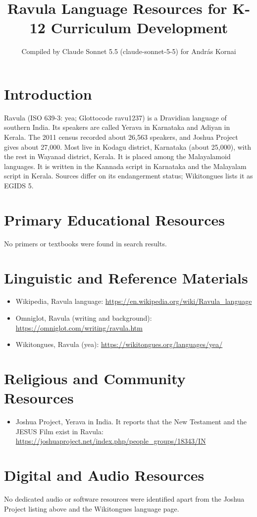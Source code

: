 \documentclass[12pt]{article}
\title{Ravula Language Resources for K-12 Curriculum Development}
\author{Compiled by Claude Sonnet 5.5 (claude-sonnet-5-5) for Andr\'as Kornai}
\date{}
\begin{document}
\maketitle

\section{Introduction}
Ravula (ISO 639-3: yea; Glottocode ravu1237) is a Dravidian language of southern India. Its speakers are called Yerava in Karnataka and Adiyan in Kerala. The 2011 census recorded about 26,563 speakers, and Joshua Project gives about 27,000. Most live in Kodagu district, Karnataka (about 25,000), with the rest in Wayanad district, Kerala. It is placed among the Malayalamoid languages. It is written in the Kannada script in Karnataka and the Malayalam script in Kerala. Sources differ on its endangerment status; Wikitongues lists it as EGIDS 5.

\section{Primary Educational Resources}
No primers or textbooks were found in search results.

\section{Linguistic and Reference Materials}
\begin{itemize}
\item Wikipedia, Ravula language: \url{https://en.wikipedia.org/wiki/Ravula_language}
\item Omniglot, Ravula (writing and background): \url{https://omniglot.com/writing/ravula.htm}
\item Wikitongues, Ravula (yea): \url{https://wikitongues.org/languages/yea/}
\end{itemize}

\section{Religious and Community Resources}
\begin{itemize}
\item Joshua Project, Yerava in India. It reports that the New Testament and the JESUS Film exist in Ravula: \url{https://joshuaproject.net/index.php/people_groups/18343/IN}
\end{itemize}

\section{Digital and Audio Resources}
No dedicated audio or software resources were identified apart from the Joshua Project listing above and the Wikitongues language page.
\end{document}

